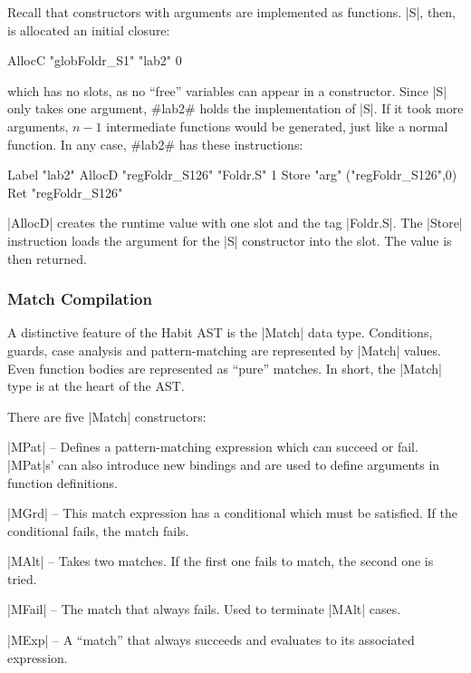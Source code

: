 \documentclass[11pt]{article}
\begin{document}
Recall that constructors with arguments are implemented as
functions. |S|, then, is allocated an initial closure:

\begin{code}
  AllocC "globFoldr_S1" "lab2" 0
\end{code}

\noindent
which has no slots, as no ``free'' variables can appear in a
constructor. Since |S| only takes one argument, #lab2# holds the
implementation of |S|. If it took more arguments, $n - 1$ intermediate
functions would be generated, just like a normal function. In any
case, #lab2# has these instructions:

\begin{code}
  Label "lab2"
  AllocD "regFoldr_S126" "Foldr.S" 1
  Store "arg" ("regFoldr_S126",0)
  Ret "regFoldr_S126"
\end{code}

|AllocD| creates the runtime value with one slot and the tag
|Foldr.S|. The |Store| instruction loads the argument for the |S|
constructor into the slot. The value is then returned.

\subsubsection{Match Compilation}

A distinctive feature of the Habit AST is the |Match| data
type. Conditions, guards, case analysis and pattern-matching are
represented by |Match| values. Even function bodies are represented as
``pure'' matches. In short, the |Match| type is at the heart of the
AST. 

There are five |Match| constructors:

\begin{description}
 \item |MPat| -- Defines a pattern-matching expression which
   can succeed or fail. |MPat|s' can also introduce new bindings and
   are used to define arguments in function definitions. 
 \item |MGrd| -- This match expression has a conditional which
   must be satisfied. If the conditional fails, the match fails. 
 \item |MAlt| -- Takes two matches. If the first one fails to
   match, the second one is tried.
 \item |MFail| -- The match that always fails. Used to
   terminate |MAlt| cases.
 \item |MExp| -- A ``match'' that always succeeds and
   evaluates to its associated expression.
\end{description}
\end{document}
